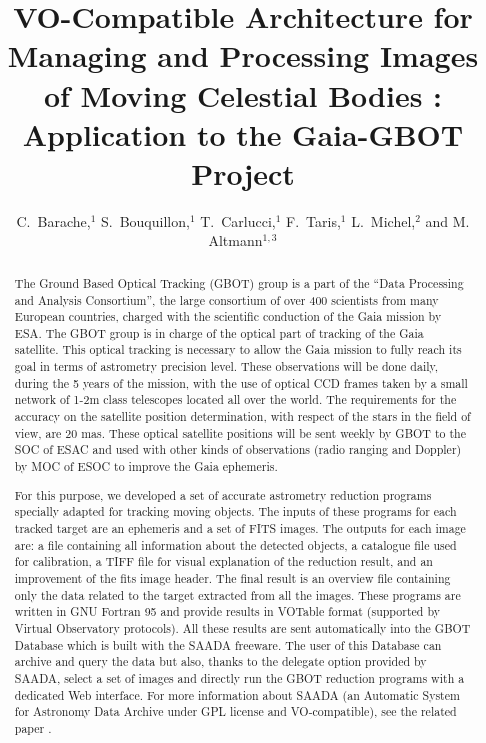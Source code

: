 
\resetcounters




\title{VO-Compatible Architecture for Managing and Processing Images of Moving Celestial Bodies : Application to the Gaia-GBOT Project}
\author{C.~Barache,$^1$ S.~Bouquillon,$^1$ T.~Carlucci,$^1$ F.~Taris,$^1$ L.~Michel,$^2$ and M. Altmann$^{1,3}$
}


\begin{abstract}
The Ground Based Optical Tracking (GBOT) group is a part of the “Data Processing and Analysis Consortium”, the large consortium of over 400 scientists from many European countries, charged with the scientific conduction of the Gaia mission by ESA. The GBOT group is in charge of the optical part of tracking of the Gaia satellite. This optical tracking is necessary to allow the Gaia mission to fully reach its goal in terms of astrometry precision level.  These observations will be done daily, during the 5 years of the mission, with the use of optical CCD frames taken by a small network of 1-2m class telescopes located all over the world. The requirements for the accuracy on the satellite position determination, with respect of the stars in the field of view, are 20 mas. These optical satellite positions will be sent weekly by GBOT to the SOC of ESAC and used with other kinds of observations (radio ranging and Doppler) by MOC of ESOC to improve the Gaia ephemeris.

For this purpose, we developed a set of accurate astrometry reduction programs specially adapted for tracking moving objects. The inputs of these programs for each tracked target are an ephemeris and a set of FITS images. The outputs for each image are: a file containing all information about the detected objects, a catalogue file used for calibration, a TIFF file for visual explanation of the reduction result, and an improvement of the fits image header. The final result is an overview file containing only the data related to the target extracted from all the images. These programs are written in GNU Fortran 95 and provide results in VOTable format (supported by Virtual Observatory protocols). All these results are sent automatically into the GBOT Database which is built with the SAADA freeware. The user of this Database can archive and query the data but also, thanks to the delegate option provided by SAADA, select a set of images and directly run the GBOT reduction programs with a dedicated Web interface. For more information about SAADA (an Automatic System for Astronomy Data Archive under GPL license and VO‑compatible), see the related paper \citet{michel12}.
\end{abstract}

